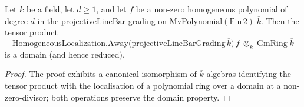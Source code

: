 \begin{theorem}
  \label{thm:gmRing_tensor_homogeneousAway_isDomain}
  Let \(\overline{k}\) be a field, let \(d \ge 1\), and let \(f\) be a
  non-zero homogeneous polynomial of degree \(d\) in the
  \(\mathrm{projectiveLineBar}\) grading on
  \(\mathrm{MvPolynomial}(\mathrm{Fin}\,2)\;\overline{k}\). Then the
  tensor product
  \[
    \mathrm{HomogeneousLocalization.Away}\bigl(\mathrm{projectiveLineBarGrading}\,\overline{k}\bigr)\,f
    \;\otimes_{\overline{k}}\;
    \mathrm{GmRing}\;\overline{k}
  \]
  is a domain (and hence reduced).
\end{theorem}
\begin{proof}

\leanok
  The proof exhibits a canonical isomorphism of \(\overline{k}\)-algebras
  identifying the tensor product with the localisation of a
  polynomial ring over a domain at a non-zero-divisor; both operations
  preserve the domain property.


\end{proof}
